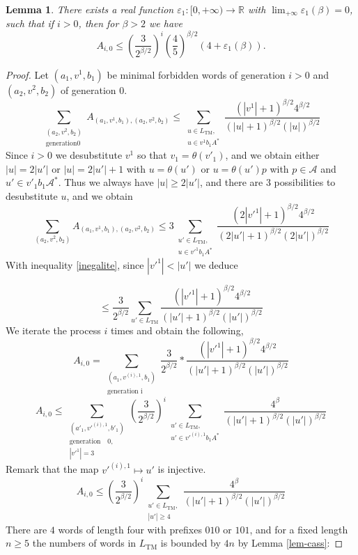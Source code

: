 \documentclass[11 pt]{article}
\newtheorem{lemma}[proposition]{Lemma}
\def\R{{\mathbb R}}
\theoremstyle{definition}
\begin{document}
\begin{lemma}\label{lem-calcul1}
There exists a real function $\varepsilon_1:[0,+\infty)\rightarrow \R$  with $\lim_{+\infty} \varepsilon_1(\beta)=0$, such that if $i>0$, then for $\beta>2$ we have 
$$A_{i,0}\leq (\frac{3}{2^{\beta/2}})^{i}(\frac{4}{5})^{\beta/2}(4+\varepsilon_1(\beta)).$$

\end{lemma}
\begin{proof}
Let $(a_1,v^1,b_1)$ be minimal forbidden words of generation $i>0$ and $(a_2, v^2, b_2)$ of generation $0$.
$$\sum_{\substack{(a_2,v^2,b_2)\\ \text{generation} 0}} A_{(a_1,v^1,b_1),(a_2,v^2,b_2)}\leq \sum_{\substack{u\in L_{\mathrm{TM}},\\ u\in v^1b_1A^*}}\frac{(|v^1|+1)^{\beta/2}4^{\beta/2}}{(|u|+1)^{\beta/2}(|u|)^{\beta/2}}$$
Since $i>0$ we desubstitute $v^1$ so that $v_1=\theta(v'_1)$, and we obtain either $|u|=2|u'|$ or $|u|=2|u'|+1$ with $u=\theta(u')$ or $u=\theta(u')p$ with $p\in\mathcal A$ and $u'\in v'_1 b_1\mathcal{A}^*$. Thus we always have $|u|\geq 2|u'|$, and
there are $3$ possibilities to desubstitute $u$, and we obtain
$$\sum_{(a_2,v^2,b_2)} A_{(a_1,v^1,b_1),(a_2,v^2,b_2)}\leq 3\sum_{\substack{u'\in L_{\mathrm{TM}},\\ u\in v'^1b_1A^*}}\frac{(2|v'^1|+1)^{\beta/2}4^{\beta/2}}{(2|u'|+1)^{\beta/2}(2|u'|)^{\beta/2}}$$
With inequality \eqref{inegalite}, since $|v'^1|<|u'|$ we deduce

$$\leq \frac{3}{2^{\beta/2}}\sum_{u'\in L_{\mathrm{TM}}} \frac{(|v'^1|+1)^{\beta/2}4^{\beta/2}}{(|u'|+1)^{\beta/2}(|u'|)^{\beta/2}} $$
We iterate the process $i$ times and obtain the following,
 $$A_{i,0}=\sum_{\substack{(a_1, v^{(i),1},b_1)\\ \text{generation i}}} \frac{3}{2^{\beta/2}}*\frac{(|v'^1|+1)^{\beta/2}4^{\beta/2}}{(|u'|+1)^{\beta/2}(|u'|)^{\beta/2}}$$
 $$A_{i,0}\leq \sum_{\substack{(a'_1,v'^{(i),1},b'_1)\\ \text{generation}\quad 0,\\ |v'^1|=3}}(\frac{3}{2^{\beta/2}})^i\sum_{\substack{u'\in L_{\mathrm{TM}},\\ u'\in v'^{(i),1}b_1A^*}} \frac{4^\beta}{(|u'|+1)^{\beta/2}(|u'|)^{\beta/2}}$$
Remark that the map $v'^{(i),1}\mapsto u'$ is injective.
$$A_{i,0}\leq (\frac{3}{2^{\beta/2}})^i\sum_{\substack{u'\in L_{\mathrm{TM}},\\ |u'|\geq 4}} \frac{4^\beta}{(|u'|+1)^{\beta/2}(|u'|)^{\beta/2}}
$$
There are $4$ words of length four with prefixes $010$ or $101$, and for a fixed length $n\geq 5$ the numbers of words in $L_{\mathrm{TM}}$ is bounded by $4n$ by Lemma \ref{lem-cass}:


\end{proof}
\end{document}

